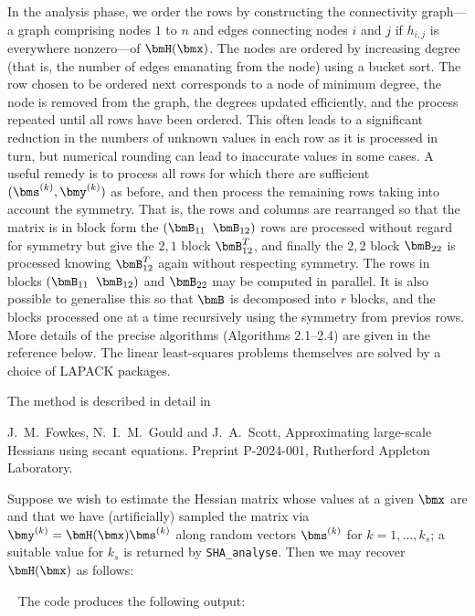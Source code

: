 \documentclass{galahad}
\newcommand{\packagename}{SHA}
\begin{document}
In the analysis phase, we order the rows by constructing the connectivity
graph---a graph comprising nodes $1$ to $n$ and edges connecting
nodes $i$ and $j$ if $h_{i,j}$ is everywhere nonzero---of $\bmH(\bmx)$.
The nodes are ordered by increasing degree (that is, the number of edges
emanating from the node) using a bucket sort. The row chosen to be
ordered next corresponds to a node of minimum degree, the node
is removed from the graph, the degrees updated efficiently, and the
process repeated until all rows have been ordered. This often leads
to a significant reduction in the numbers of unknown values in each
row as it is processed in turn, but numerical rounding can lead to
inaccurate values in some cases. A useful remedy is to process all
rows for which there are sufficient $(\bms^{(k)}, \bmy^{(k)})$ as before,
and then process the remaining rows taking into account the symmetry.
That is, the rows and columns are rearranged so that the matrix
is in block form
the $( \bmB_{11} \;\; \bmB_{12})$ rows are processed without regard
for symmetry but give the $2,1$ block $\bmB^T_{12}$, and finally
the $2,2$ block $\bmB_{22}$ is processed knowing $\bmB^T_{12}$
again without respecting symmetry. The rows in blocks
$( \bmB_{11} \;\; \bmB_{12})$ and $\bmB_{22}$ may be computed in parallel.
It is also possible to generalise this so that $\bmB$ is decomposed into
$r$ blocks, and the blocks processed one at a time recursively using the
symmetry from previos rows.
More details of the precise algorithms (Algorithms 2.1--2.4)
are given in the reference below. The linear least-squares problems 
themselves are solved by a choice of LAPACK packages.

\vspace*{1mm}

\galreference
\vspace*{1mm}

\noindent
The method is described in detail in
\vspace*{1mm}

\noindent

J.\ M.\ Fowkes, N.\ I.\ M.\ Gould and J.\ A.\ Scott,
Approximating large-scale Hessians using secant equations.
Preprint P-2024-001, Rutherford Appleton Laboratory.


\galexamples
Suppose we wish to estimate the Hessian matrix whose values at
a given $\bmx$ are
and that we have (artificially) sampled the matrix via
$\bmy^{(k)} = \bmH(\bmx) \bms^{(k)}$ along random vectors
$\bms^{(k)}$ for $k = 1, \ldots, k_s$; a suitable value for $k_s$ is
returned by {\tt \packagename\_analyse}. Then we may recover $\bmH(\bmx)$
as follows:

{\tt \small
\VerbatimInput{\packageexample}
}
\noindent
The code produces the following output:
{\tt \small
\VerbatimInput{\packageresults}
}
\noindent
\end{document}
